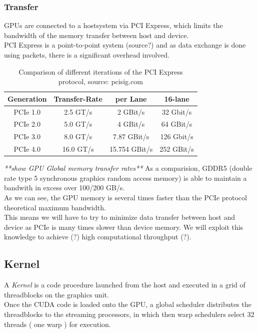 \subsubsection{Transfer}
GPUs are connected to a hostsystem via PCI Express, which limits the bandwidth of the memory transfer between host and device.\\
PCI Express is a point-to-point system (source?) and as data exchange is done using packets,
there is a significant overhead involved.\\
\begin{table}
\centering
\begin{tabular}{c|c|c|c}
\textbf{Generation} &   \textbf{Transfer-Rate}      & \textbf{per Lane} & \textbf{16-lane}\\
\hline\hline
PCIe 1.0     &   2.5 GT/s               & 2 GBit/s          & 32 Gbit/s\\
PCIe 2.0     &   5.0 GT/s               & 4 GBit/s          & 64 GBit/s\\
PCIe 3.0     &   8.0 GT/s               & 7.87 GBit/s       & 126 Gbit/s\\
PCIe 4.0     &   16.0 GT/s              & 15.754 GBit/s     & 252 GBit/s\\
\hline
\end{tabular}
\caption{Comparison of different iterations of the PCI Express protocol, source: pcisig.com}
\label{tab:pci_comp}
\end{table}
\emph{**show GPU Global memory transfer rates**}
As a comparision, GDDR5 (double rate type 5 synchronous graphics random access memory) is able to maintain a bandwith in excess over 100/200 GB/s.
\\
As we can see, the GPU memory is several times faster than the PCIe protocol theoretical maximum bandwidth.\\
This means we will have to try to minimize data transfer between host and device as PCIe is many times slower than device memory.
We will exploit this knowledge to achieve (?) high computational throughput (?).
\subsection{Kernel}
A \emph{Kernel} is a code procedure launched from the host and executed in a grid of threadblocks on the graphics unit.\\
Once the CUDA code is loaded onto the GPU, a global scheduler distributes the threadblocks to the streaming processors, in which then warp schedulers select 32 threads ( one warp ) for execution.\\

